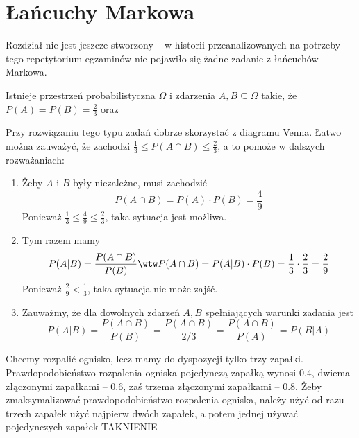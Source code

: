 \section{Łańcuchy Markowa}

\begin{editorsnote}
    Rozdział nie jest jeszcze stworzony -- w historii przeanalizowanych na potrzeby tego repetytorium egzaminów nie pojawiło się żadne zadanie z łańcuchów Markowa.
\end{editorsnote}

\begin{solutions}
    \sol Istnieje przestrzeń probabilistyczna $\Omega$ i zdarzenia $A,B\subseteq\Omega$ takie, że $P(A)=P(B)=\frac{2}{3}$ oraz

    Przy rozwiązaniu tego typu zadań dobrze skorzystać z diagramu Venna. Łatwo można zauważyć, że zachodzi $\frac{1}{3} \leq P(A \cap B) \leq \frac{2}{3}$, a to pomoże w dalszych rozważaniach:
    \begin{enumerate}[\bf A.]
        \item Żeby $A$ i $B$ były niezależne, musi zachodzić
        $$P(A \cap B) = P(A) \cdot P(B) = \frac{4}{9}$$
        Ponieważ $\frac{1}{3} \leq \frac{4}{9} \leq \frac{2}{3}$, taka sytuacja jest możliwa.
        
        \item Tym razem mamy
        $$P(A | B) = \frac{P(A \cap B)}{P(B)} \wtw P(A \cap B) = P(A|B) \cdot P(B) = \frac{1}{3} \cdot \frac{2}{3} = \frac{2}{9}$$
        Ponieważ $\frac{2}{9} < \frac{1}{3}$, taka sytuacja nie może zajść.
        
        \item Zauważmy, że dla dowolnych zdarzeń $A, B$ spełniających warunki zadania jest
        $$P(A|B) = \frac{P(A \cap B)}{P(B)} = \frac{P(A \cap B)}{2/3} = \frac{P(A \cap B)}{P(A)} = P(B|A)$$
    \end{enumerate}

    \sol Chcemy rozpalić ognisko, lecz mamy do dyspozycji tylko trzy zapałki. Prawdopodobieństwo rozpalenia ogniska pojedynczą zapałką wynosi $0.4$, dwiema złączonymi zapałkami -- $0.6$, zaś trzema złączonymi zapałkami -- $0.8$. Żeby zmaksymalizować prawdopodobieństwo rozpalenia ogniska, należy
    \answerss
    {użyć od razu trzech zapałek}
    {użyć najpierw dwóch zapałek, a potem jednej}
    {używać pojedynczych zapałek}
    {TAK}{NIE}{NIE}


\end{solutions}
